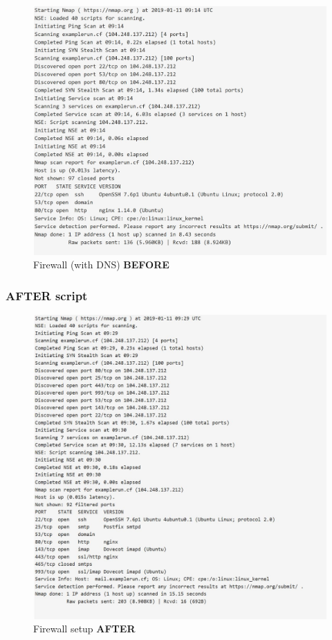 \begin{figure}[H]
	\centering
	\includegraphics[width=\linewidth]{pics/fw_before_with_dns}
    \caption{Firewall (with DNS) \textbf{BEFORE}}
	\label{fig:firewallwithdnsbefore}
\end{figure}


\subsubsection{AFTER script}

\begin{figure}[H]
	\centering
	\includegraphics[width=\linewidth]{pics/fw_after}
	\caption{Firewall setup \textbf{AFTER}}
	\label{fig:firewallafter}
\end{figure}
\newpage
